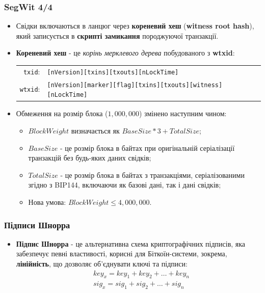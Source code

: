 \documentclass{beamer}
\begin{document}
\begin{frame}
  \frametitle{SegWit 4/4}
  \small
  \begin{itemize}
  \item Свідки включаються в ланцюг через \textbf{кореневий хеш}
    (\textbf{witness root hash}), який записується в \textbf{скрипті замикання}
    породжуючої транзакції.
  \item \textbf{Кореневий хеш} - це \textit{корінь мерклевого дерева}
    побудованого з \textbf{wtxid}:
    \break
    \begin{tabular}{rl}
      \texttt{txid}: &\tiny\texttt{[nVersion][txins][txouts][nLockTime]} \\
      \texttt{wtxid}: &\tiny\texttt{[nVersion][marker][flag][txins][txouts][witness][nLockTime]} \\
    \end{tabular}
  \item Обмеження на розмір блока ($1,000,000$) змінено наступним чином:
    \begin{itemize}
    \item $BlockWeight$ визначається як $BaseSize * 3 + TotalSize$;
    \item $BaseSize$ - це розмір блока в байтах при оригінальній серіалізації
      транзакцій без будь-яких даних свідків;
    \item $TotalSize$ - це розмір блока в байтах з транзакціями, серіалізованими
      згідно з BIP144, включаючи як базові дані, так і дані свідків;
    \item Нова умова: $BlockWeight \leq 4,000,000$.
    \end{itemize}
  \end{itemize}
\end{frame}

\begin{frame}
  \frametitle{Підписи Шнорра}
  \begin{itemize}
  \item \textbf{Підпис Шнорра} - це альтернативна схема криптографічних
    підписів, яка забезпечує певні властивості, корисні для Біткоїн-системи,
    зокрема, \textbf{лінійність}, що дозволяє об'єднувати ключі та підписи:
    \begin{align*}
      &key_x = key_1 + key_2 + \dots + key_n \\
      &sig_x = sig_1 + sig_2 + \dots + sig_n \\
    \end{align*}
  \end{itemize}
\end{frame}
\end{document}
